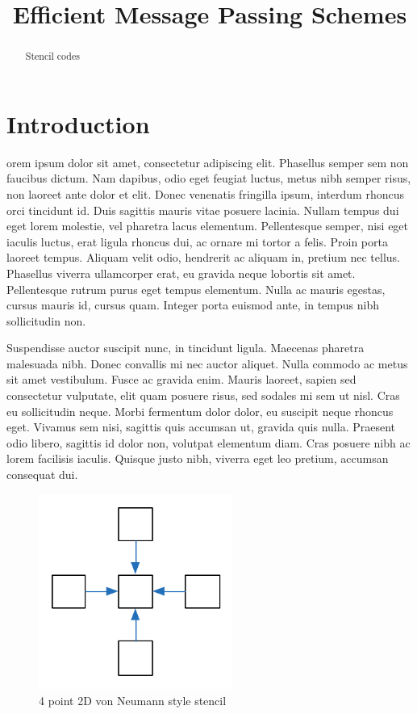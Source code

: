 \documentclass[10pt, a4paper, conference]{IEEEtran}
\title{Efficient Message Passing Schemes}
\author{
	\IEEEauthorblockN{Stephen I. Roberts}
	\IEEEauthorblockA{Department of Computer Science\\
					 The University of Warwick}
}
\date{}
\begin{document}
                                                                
\maketitle                                                                    
\begin{abstract}
Stencil codes
\end{abstract}

\section{Introduction}

orem ipsum dolor sit amet, consectetur adipiscing elit. Phasellus semper sem non faucibus dictum. Nam dapibus, odio eget feugiat luctus, metus nibh semper risus, non laoreet ante dolor et elit. Donec venenatis fringilla ipsum, interdum rhoncus orci tincidunt id. Duis sagittis mauris vitae posuere lacinia. Nullam tempus dui eget lorem molestie, vel pharetra lacus elementum. Pellentesque semper, nisi eget iaculis luctus, erat ligula rhoncus dui, ac ornare mi tortor a felis. Proin porta laoreet tempus. Aliquam velit odio, hendrerit ac aliquam in, pretium nec tellus. Phasellus viverra ullamcorper erat, eu gravida neque lobortis sit amet. Pellentesque rutrum purus eget tempus elementum. Nulla ac mauris egestas, cursus mauris id, cursus quam. Integer porta euismod ante, in tempus nibh sollicitudin non.

Suspendisse auctor suscipit nunc, in tincidunt ligula. Maecenas pharetra malesuada nibh. Donec convallis mi nec auctor aliquet. Nulla commodo ac metus sit amet vestibulum. Fusce ac gravida enim. Mauris laoreet, sapien sed consectetur vulputate, elit quam posuere risus, sed sodales mi sem ut nisl. Cras eu sollicitudin neque. Morbi fermentum dolor dolor, eu suscipit neque rhoncus eget. Vivamus sem nisi, sagittis quis accumsan ut, gravida quis nulla. Praesent odio libero, sagittis id dolor non, volutpat elementum diam. Cras posuere nibh ac lorem facilisis iaculis. Quisque justo nibh, viverra eget leo pretium, accumsan consequat dui.

\begin{figure} 
\centering 
\includegraphics[width=2.5in]{graphics/2d_von_neumann_stencil.pdf}
    \caption{4 point 2D von Neumann style stencil}
    \label{fig:von_neumann_stencil}
\end{figure} 
\end{document}
